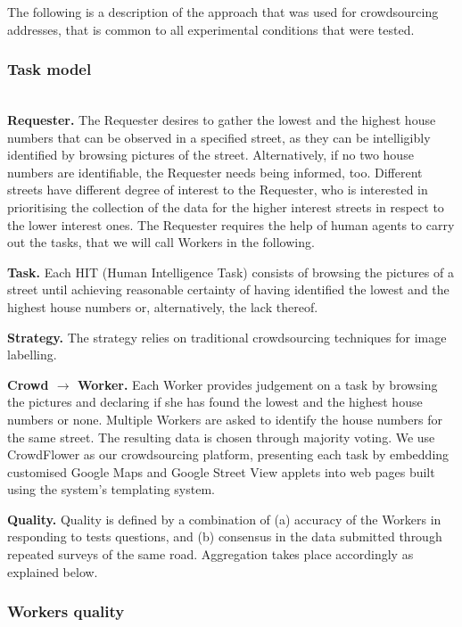     The following is a description of the approach that was used for crowdsourcing addresses, that is common to all experimental conditions that were tested.

    \subsubsection{Task model} \leavevmode \\ %

        \textbf{Requester.} The Requester desires to gather the lowest and the highest house numbers that can be observed in a specified street, as they can be intelligibly identified by browsing pictures of the street. Alternatively, if no two house numbers are identifiable, the Requester needs being informed, too. Different streets have different degree of interest to the Requester, who is interested in prioritising the collection of the data for the higher interest streets in respect to the lower interest ones. The Requester requires the help of human agents to carry out the tasks, that we will call Workers in the following.
        
        \textbf{Task.} Each HIT (Human Intelligence Task) consists of browsing the pictures of a street until achieving reasonable certainty of having identified the lowest and the highest house numbers or, alternatively, the lack thereof.
        
        \textbf{Strategy.} 
        The strategy relies on traditional crowdsourcing techniques for image labelling.

        \textbf{Crowd $\rightarrow$ Worker.} Each Worker provides judgement on a task by browsing the pictures and declaring if she has found the lowest and the highest house numbers or none. Multiple Workers are asked to identify the house numbers for the same street. The resulting data is chosen through majority voting. We use CrowdFlower as our crowdsourcing platform, presenting each task by embedding customised Google Maps and Google Street View applets into web pages built using the system's templating system. 
    
        \textbf{Quality.} Quality is defined by a combination of (a) accuracy of the Workers in responding to tests questions, and (b) consensus in the data submitted through repeated surveys of the same road. Aggregation takes place accordingly as explained below.
        
    \subsubsection{Workers quality}
    
